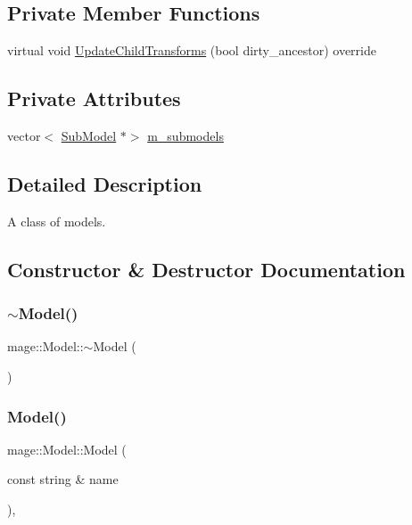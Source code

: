 \subsection*{Private Member Functions}
\begin{DoxyCompactItemize}
\item 
virtual void \hyperlink{classmage_1_1_model_a2f3c812220367093bdca125e6b6e898a}{Update\+Child\+Transforms} (bool dirty\+\_\+ancestor) override
\end{DoxyCompactItemize}
\subsection*{Private Attributes}
\begin{DoxyCompactItemize}
\item 
vector$<$ \hyperlink{classmage_1_1_sub_model}{Sub\+Model} $\ast$$>$ \hyperlink{classmage_1_1_model_ab62e74450091e144b7b62d6570ec7af7}{m\+\_\+submodels}
\end{DoxyCompactItemize}


\subsection{Detailed Description}
A class of models. 

\subsection{Constructor \& Destructor Documentation}
\hypertarget{classmage_1_1_model_af9f45ed2dcf470f85bbfd144ca9857a7}{}\label{classmage_1_1_model_af9f45ed2dcf470f85bbfd144ca9857a7} 
\subsubsection{\texorpdfstring{$\sim$\+Model()}{~Model()}}
{\footnotesize\ttfamily mage\+::\+Model\+::$\sim$\+Model (\begin{DoxyParamCaption}{ }\end{DoxyParamCaption})\hspace{0.3cm}{\ttfamily [virtual]}}

\hypertarget{classmage_1_1_model_adc37cc2030a93cde5da20f9a941c060e}{}\label{classmage_1_1_model_adc37cc2030a93cde5da20f9a941c060e} 
\subsubsection{\texorpdfstring{Model()}{Model()}\hspace{0.1cm}{\footnotesize\ttfamily [1/3]}}
{\footnotesize\ttfamily mage\+::\+Model\+::\+Model (\begin{DoxyParamCaption}\item[{const string \&}]{name }\end{DoxyParamCaption})\hspace{0.3cm}{\ttfamily [explicit]}, {\ttfamily [protected]}}

